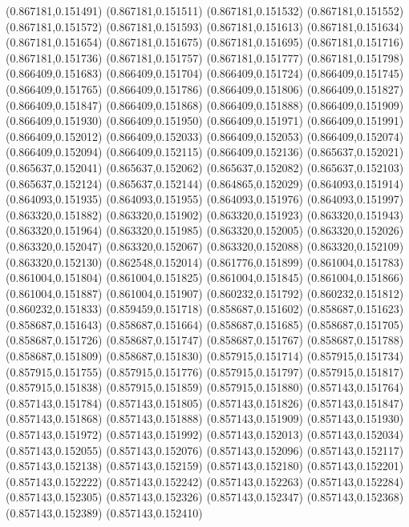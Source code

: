 (0.867181,0.151491)
(0.867181,0.151511)
(0.867181,0.151532)
(0.867181,0.151552)
(0.867181,0.151572)
(0.867181,0.151593)
(0.867181,0.151613)
(0.867181,0.151634)
(0.867181,0.151654)
(0.867181,0.151675)
(0.867181,0.151695)
(0.867181,0.151716)
(0.867181,0.151736)
(0.867181,0.151757)
(0.867181,0.151777)
(0.867181,0.151798)
(0.866409,0.151683)
(0.866409,0.151704)
(0.866409,0.151724)
(0.866409,0.151745)
(0.866409,0.151765)
(0.866409,0.151786)
(0.866409,0.151806)
(0.866409,0.151827)
(0.866409,0.151847)
(0.866409,0.151868)
(0.866409,0.151888)
(0.866409,0.151909)
(0.866409,0.151930)
(0.866409,0.151950)
(0.866409,0.151971)
(0.866409,0.151991)
(0.866409,0.152012)
(0.866409,0.152033)
(0.866409,0.152053)
(0.866409,0.152074)
(0.866409,0.152094)
(0.866409,0.152115)
(0.866409,0.152136)
(0.865637,0.152021)
(0.865637,0.152041)
(0.865637,0.152062)
(0.865637,0.152082)
(0.865637,0.152103)
(0.865637,0.152124)
(0.865637,0.152144)
(0.864865,0.152029)
(0.864093,0.151914)
(0.864093,0.151935)
(0.864093,0.151955)
(0.864093,0.151976)
(0.864093,0.151997)
(0.863320,0.151882)
(0.863320,0.151902)
(0.863320,0.151923)
(0.863320,0.151943)
(0.863320,0.151964)
(0.863320,0.151985)
(0.863320,0.152005)
(0.863320,0.152026)
(0.863320,0.152047)
(0.863320,0.152067)
(0.863320,0.152088)
(0.863320,0.152109)
(0.863320,0.152130)
(0.862548,0.152014)
(0.861776,0.151899)
(0.861004,0.151783)
(0.861004,0.151804)
(0.861004,0.151825)
(0.861004,0.151845)
(0.861004,0.151866)
(0.861004,0.151887)
(0.861004,0.151907)
(0.860232,0.151792)
(0.860232,0.151812)
(0.860232,0.151833)
(0.859459,0.151718)
(0.858687,0.151602)
(0.858687,0.151623)
(0.858687,0.151643)
(0.858687,0.151664)
(0.858687,0.151685)
(0.858687,0.151705)
(0.858687,0.151726)
(0.858687,0.151747)
(0.858687,0.151767)
(0.858687,0.151788)
(0.858687,0.151809)
(0.858687,0.151830)
(0.857915,0.151714)
(0.857915,0.151734)
(0.857915,0.151755)
(0.857915,0.151776)
(0.857915,0.151797)
(0.857915,0.151817)
(0.857915,0.151838)
(0.857915,0.151859)
(0.857915,0.151880)
(0.857143,0.151764)
(0.857143,0.151784)
(0.857143,0.151805)
(0.857143,0.151826)
(0.857143,0.151847)
(0.857143,0.151868)
(0.857143,0.151888)
(0.857143,0.151909)
(0.857143,0.151930)
(0.857143,0.151972)
(0.857143,0.151992)
(0.857143,0.152013)
(0.857143,0.152034)
(0.857143,0.152055)
(0.857143,0.152076)
(0.857143,0.152096)
(0.857143,0.152117)
(0.857143,0.152138)
(0.857143,0.152159)
(0.857143,0.152180)
(0.857143,0.152201)
(0.857143,0.152222)
(0.857143,0.152242)
(0.857143,0.152263)
(0.857143,0.152284)
(0.857143,0.152305)
(0.857143,0.152326)
(0.857143,0.152347)
(0.857143,0.152368)
(0.857143,0.152389)
(0.857143,0.152410)
